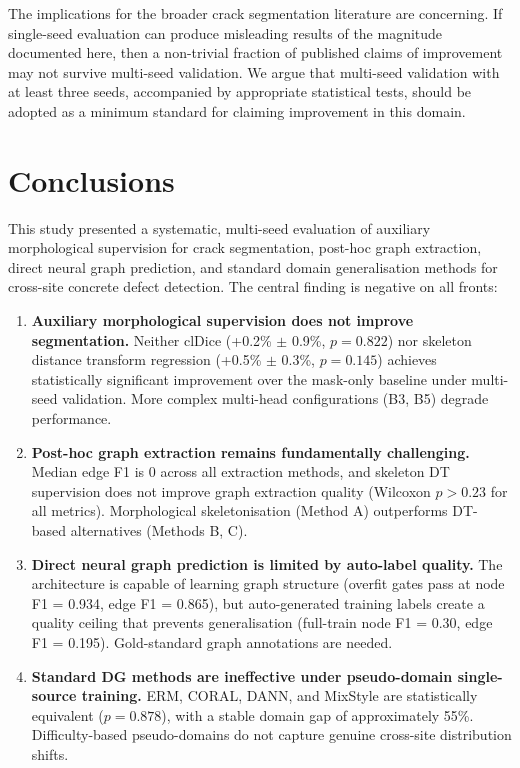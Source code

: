 \documentclass[preprint,12pt]{elsarticle}
\begin{document}
The implications for the broader crack segmentation literature are concerning. If single-seed evaluation can produce misleading results of the magnitude documented here, then a non-trivial fraction of published claims of improvement may not survive multi-seed validation. We argue that multi-seed validation with at least three seeds, accompanied by appropriate statistical tests, should be adopted as a minimum standard for claiming improvement in this domain.



\section{Conclusions}
\label{sec:conclusions}

This study presented a systematic, multi-seed evaluation of auxiliary morphological supervision for crack segmentation, post-hoc graph extraction, direct neural graph prediction, and standard domain generalisation methods for cross-site concrete defect detection. The central finding is negative on all fronts:

\begin{enumerate}
    \item \textbf{Auxiliary morphological supervision does not improve segmentation.} Neither clDice (+0.2\% $\pm$ 0.9\%, $p = 0.822$) nor skeleton distance transform regression (+0.5\% $\pm$ 0.3\%, $p = 0.145$) achieves statistically significant improvement over the mask-only baseline under multi-seed validation. More complex multi-head configurations (B3, B5) degrade performance.

    \item \textbf{Post-hoc graph extraction remains fundamentally challenging.} Median edge F1 is 0 across all extraction methods, and skeleton DT supervision does not improve graph extraction quality (Wilcoxon $p > 0.23$ for all metrics). Morphological skeletonisation (Method A) outperforms DT-based alternatives (Methods B, C).

    \item \textbf{Direct neural graph prediction is limited by auto-label quality.} The architecture is capable of learning graph structure (overfit gates pass at node F1 = 0.934, edge F1 = 0.865), but auto-generated training labels create a quality ceiling that prevents generalisation (full-train node F1 = 0.30, edge F1 = 0.195). Gold-standard graph annotations are needed.

    \item \textbf{Standard DG methods are ineffective under pseudo-domain single-source training.} ERM, CORAL, DANN, and MixStyle are statistically equivalent ($p = 0.878$), with a stable domain gap of approximately 55\%. Difficulty-based pseudo-domains do not capture genuine cross-site distribution shifts.
\end{enumerate}
\end{document}
